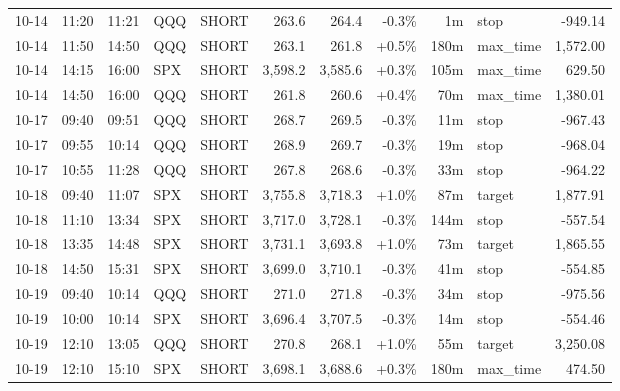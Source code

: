 \documentclass[11pt,a4paper,twoside]{article}
\begin{document}
\begin{center}
\begin{longtable}{>{\color{txtmain}}l l l l l r r r r >{\color{txtmain}}l r}
10-14 & 11:20 & 11:21 & QQQ & SHORT & 263.6 & 264.4 & \textcolor{lossred}{-0.3\%} & 1m & stop & \textcolor{lossred}{-949.14} \\
10-14 & 11:50 & 14:50 & QQQ & SHORT & 263.1 & 261.8 & \textcolor{wingreen}{+0.5\%} & 180m & max\_time & \textcolor{wingreen}{1,572.00} \\
10-14 & 14:15 & 16:00 & SPX & SHORT & 3,598.2 & 3,585.6 & \textcolor{wingreen}{+0.3\%} & 105m & max\_time & \textcolor{wingreen}{629.50} \\
10-14 & 14:50 & 16:00 & QQQ & SHORT & 261.8 & 260.6 & \textcolor{wingreen}{+0.4\%} & 70m & max\_time & \textcolor{wingreen}{1,380.01} \\
10-17 & 09:40 & 09:51 & QQQ & SHORT & 268.7 & 269.5 & \textcolor{lossred}{-0.3\%} & 11m & stop & \textcolor{lossred}{-967.43} \\
10-17 & 09:55 & 10:14 & QQQ & SHORT & 268.9 & 269.7 & \textcolor{lossred}{-0.3\%} & 19m & stop & \textcolor{lossred}{-968.04} \\
10-17 & 10:55 & 11:28 & QQQ & SHORT & 267.8 & 268.6 & \textcolor{lossred}{-0.3\%} & 33m & stop & \textcolor{lossred}{-964.22} \\
10-18 & 09:40 & 11:07 & SPX & SHORT & 3,755.8 & 3,718.3 & \textcolor{wingreen}{+1.0\%} & 87m & target & \textcolor{wingreen}{1,877.91} \\
10-18 & 11:10 & 13:34 & SPX & SHORT & 3,717.0 & 3,728.1 & \textcolor{lossred}{-0.3\%} & 144m & stop & \textcolor{lossred}{-557.54} \\
10-18 & 13:35 & 14:48 & SPX & SHORT & 3,731.1 & 3,693.8 & \textcolor{wingreen}{+1.0\%} & 73m & target & \textcolor{wingreen}{1,865.55} \\
10-18 & 14:50 & 15:31 & SPX & SHORT & 3,699.0 & 3,710.1 & \textcolor{lossred}{-0.3\%} & 41m & stop & \textcolor{lossred}{-554.85} \\
10-19 & 09:40 & 10:14 & QQQ & SHORT & 271.0 & 271.8 & \textcolor{lossred}{-0.3\%} & 34m & stop & \textcolor{lossred}{-975.56} \\
10-19 & 10:00 & 10:14 & SPX & SHORT & 3,696.4 & 3,707.5 & \textcolor{lossred}{-0.3\%} & 14m & stop & \textcolor{lossred}{-554.46} \\
10-19 & 12:10 & 13:05 & QQQ & SHORT & 270.8 & 268.1 & \textcolor{wingreen}{+1.0\%} & 55m & target & \textcolor{wingreen}{3,250.08} \\
10-19 & 12:10 & 15:10 & SPX & SHORT & 3,698.1 & 3,688.6 & \textcolor{wingreen}{+0.3\%} & 180m & max\_time & \textcolor{wingreen}{474.50} \\

\end{longtable}
\end{center}
\end{document}
